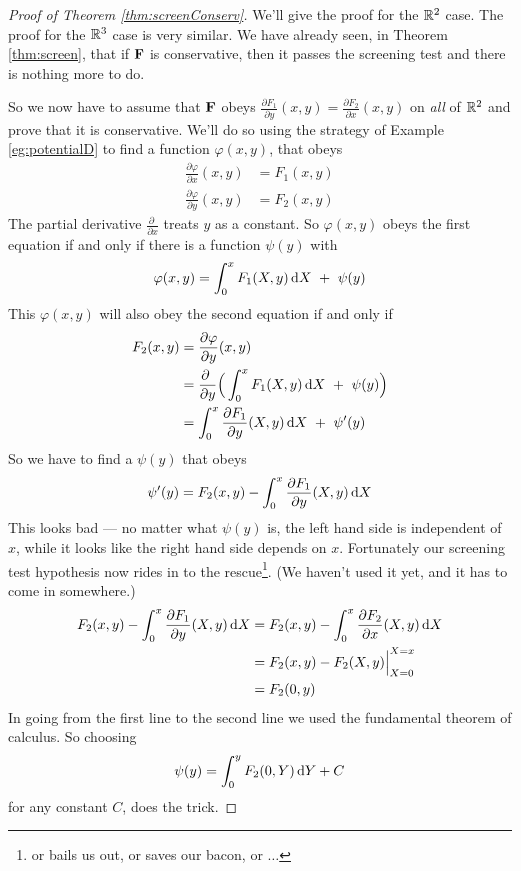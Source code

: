 \begin{proof}[Proof of Theorem \ref{thm:screenConserv}]
We'll give the proof for the $\mathbb{R}^2$ case. The proof for the $\mathbb{R}^3$ case
is very similar.
We have already seen, in Theorem \ref{thm:screen}, that if $\mathbf{F}$ 
is conservative, then it passes the screening test and there is nothing more
to do. 

So we now have 
to assume that $\mathbf{F}$ obeys $\frac{\partial F_1}{\partial y}(x,y) 
=  \frac{\partial F_2}{\partial x}(x,y)$ on \emph{all} of $\mathbb{R}^2$
and prove that it is conservative. We'll do so 
using the strategy of Example \ref{eg:potentialD} to find a function
$\varphi(x,y)$, that obeys
\begin{equation*}%
\begin{split}
\frac{\partial \varphi}{\partial x}(x,y) &= F_1(x,y) \\
\frac{\partial \varphi}{\partial y}(x,y) &= F_2(x,y)
\end{split}
\end{equation*}
The partial derivative $\frac{\partial \ }{\partial x}$ treats $y$
as a constant. So $\varphi(x,y)$ obeys the first equation
if and only if there is a function $\psi(y)$ with
\begin{equation*}
\varphi(x,y)
=\int_0^x F_1(X,y)\,\mathrm{d}X
\ +\ \psi(y)
\end{equation*}
This $\varphi(x,y)$ will also obey the second equation if and only if 
\begin{align*}
F_2(x,y)&= \frac{\partial \varphi}{\partial y}(x,y)\\
&=\frac{\partial \ }{\partial y}\Big(\int_0^x F_1(X,y)\,\dee{X}\ +\ \psi(y)\Big)
\\
&=\int_0^x \frac{\partial F_1}{\partial y}(X,y)\,\dee{X}\ +\ \psi'(y)
\end{align*}
So we have to find a $\psi(y)$ that obeys
\begin{equation*}
\psi'(y) = F_2(x,y) - 
                \int_0^x \frac{\partial F_1}{\partial y}(X,y)\,\mathrm{d}X
\end{equation*}
This looks bad --- no matter what $\psi(y)$ is, the left hand side is 
independent of $x$, while it looks like the right hand side depends on $x$. 
Fortunately our screening test hypothesis now rides in to the 
rescue\footnote{or bails us out, or saves our bacon, or $\ldots$}.
(We haven't used it yet, and it has to come in somewhere.)
\begin{align*}
F_2(x,y) -  \int_0^x \frac{\partial F_1}{\partial y}(X,y)\,\mathrm{d}X
&=F_2(x,y) -  \int_0^x \frac{\partial F_2}{\partial x}(X,y)\,\mathrm{d}X \\
&= F_2(x,y) - F_2(X,y)\Big|_{X=0}^{X=x} \\
&=F_2(0,y)
\end{align*}
In going from the first line to the second line we used 
the fundamental theorem of calculus. So choosing
\begin{equation*}
\psi(y) = \int_0^y F_2(0,Y)\,\mathrm{d}Y +C
\end{equation*}
for any constant $C$, does the trick.
\end{proof}


